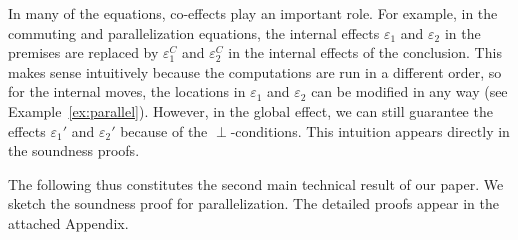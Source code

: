 \documentclass[nocopyrightspace,preprint]{sigplanconf}
\newcommand{\eff}{\varepsilon}
\begin{document}
In many of the equations, co-effects play an important role. For example, in the commuting and parallelization equations, the internal effects $\eff_1$ and $\eff_2$ in the premises are replaced by  $\eff_1^C$ and $\eff_2^C$ in the internal effects of the conclusion. This makes sense intuitively because the computations are run in a different order, so for the internal moves, the locations in $\eff_1$ and $\eff_2$ can be modified in any way (see Example~\ref{ex:parallel}). However, in the global effect, we can still guarantee the effects $\eff_1'$ and $\eff_2'$ because of the $\perp$-conditions. This intuition appears directly in the soundness proofs.

The following thus constitutes the second main technical
result of our paper. We sketch the soundness proof for parallelization. The detailed proofs appear in the attached Appendix.
\end{document}
